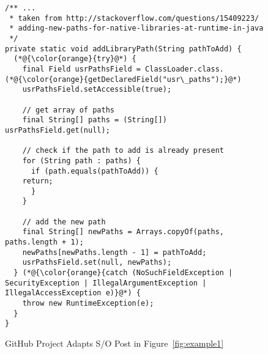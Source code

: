 \begin{figure}[t]%
	\centering
\begin{lstlisting}[]
/** ...
 * taken from http://stackoverflow.com/questions/15409223/
 * adding-new-paths-for-native-libraries-at-runtime-in-java
 */
private static void addLibraryPath(String pathToAdd) {
  (*@{\color{orange}{try}@*) {
    final Field usrPathsField = ClassLoader.class.(*@{\color{orange}{getDeclaredField("usr\_paths");}@*)
    usrPathsField.setAccessible(true);

    // get array of paths
    final String[] paths = (String[]) usrPathsField.get(null);

    // check if the path to add is already present
    for (String path : paths) {
      if (path.equals(pathToAdd)) {
	return;
      }
    }

    // add the new path
    final String[] newPaths = Arrays.copyOf(paths, paths.length + 1);
    newPaths[newPaths.length - 1] = pathToAdd;
    usrPathsField.set(null, newPaths);
  } (*@{\color{orange}{catch (NoSuchFieldException | SecurityException | IllegalArgumentException |    IllegalAccessException e)}@*) {
	throw new RuntimeException(e);
  }
}
\end{lstlisting}
        \vspace{-16pt}
        \caption{GitHub Project  Adapts S/O Post in Figure~\ref{fig:example1}}
        \label{fig:example2}
\end{figure}
